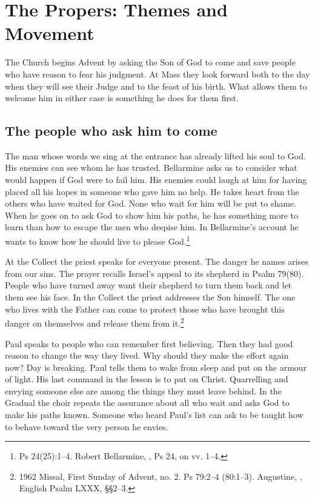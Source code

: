 \section{The Propers: Themes and Movement}

The Church begins Advent by asking the Son of God to come and save people who have reason to fear his judgment. At Mass they look forward both to the day when they will see their Judge and to the feast of his birth. What allows them to welcome him in either case is something he does for them first.

\subsection{The people who ask him to come}

The man whose words we sing at the entrance has already lifted his soul to God. His enemies can see whom he has trusted. Bellarmine asks us to consider what would happen if God were to fail him. His enemies could laugh at him for having placed all his hopes in someone who gave him no help. He takes heart from the others who have waited for God. None who wait for him will be put to shame. When he goes on to ask God to show him his paths, he has something more to learn than how to escape the men who despise him. In Bellarmine's account he wants to know how he should live to please God.\footnote{Ps 24(25):1--4. Robert Bellarmine, , Ps 24, on vv. 1--4.}

At the Collect the priest speaks for everyone present. The danger he names arises from our sins. The prayer recalls Israel's appeal to its shepherd in Psalm 79(80). People who have turned away want their shepherd to turn them back and let them see his face. In the Collect the priest addresses the Son himself. The one who lives with the Father can come to protect those who have brought this danger on themselves and release them from it.\footnote{1962 Missal, First Sunday of Advent, no. 2. Ps 79:2--4 (80:1--3). Augustine, , English Psalm LXXX, §§2--3.}

Paul speaks to people who can remember first believing. Then they had good reason to change the way they lived. Why should they make the effort again now? Day is breaking. Paul tells them to wake from sleep and put on the armour of light. His last command in the lesson is to put on Christ. Quarrelling and envying someone else are among the things they must leave behind. In the Gradual the choir repeats the assurance about all who wait and asks God to make his paths known. Someone who heard Paul's list can ask to be taught how to behave toward the very person he envies.

